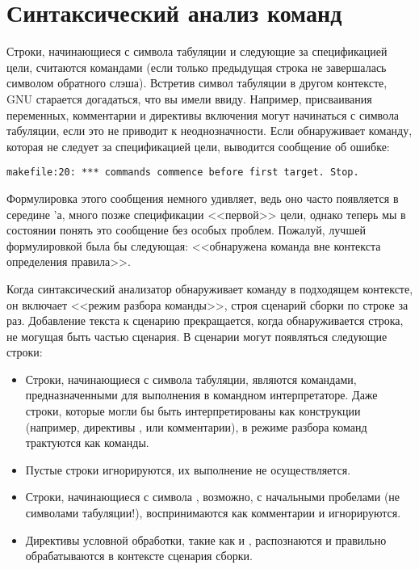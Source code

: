 \section{Синтаксический анализ команд}
\label{sec:parsing_commands}

Строки, начинающиеся с символа табуляции и следующие за спецификацией
цели, считаются командами (если только предыдущая строка не
завершалась символом обратного слэша). Встретив символ табуляции в
другом контексте, GNU \GNUmake{} старается догадаться, что вы имели
ввиду. Например, присваивания переменных, комментарии и директивы
включения могут начинаться с символа табуляции, если это не приводит к
неоднозначности. Если \GNUmake{} обнаруживает команду, которая не
следует за спецификацией цели, выводится сообщение об ошибке:

{\footnotesize
\begin{verbatim}
makefile:20: *** commands commence before first target. Stop.
\end{verbatim}
}

Формулировка этого сообщения немного удивляет, ведь оно часто
появляется в середине \Makefile{}'а, много позже спецификации
<<первой>> цели, однако теперь мы в состоянии понять это сообщение без
особых проблем. Пожалуй, лучшей формулировкой была бы следующая:
<<обнаружена команда вне контекста определения правила>>.

Когда синтаксический анализатор обнаруживает команду в подходящем
контексте, он включает <<режим разбора команды>>, строя сценарий
сборки по строке за раз. Добавление текста к сценарию прекращается,
когда обнаруживается строка, не могущая быть частью сценария.  В
сценарии могут появляться следующие строки:

\begin{itemize}
\item Строки, начинающиеся с символа табуляции, являются командами,
предназначенными для выполнения в командном интерпретаторе. Даже
строки, которые могли бы быть интерпретированы как конструкции
\GNUmake{} (например, директивы , 
или комментарии), в режиме разбора команд трактуются как команды.
\item Пустые строки игнорируются, их выполнение не осуществляется.
\item Строки, начинающиеся с символа \command{\#}, возможно, с
начальными пробелами (не символами табуляции!), воспринимаются как
комментарии \GNUmake{} и игнорируются.
\item Директивы условной обработки, такие как  и
, распознаются и правильно обрабатываются в контексте
сценария сборки.
\end{itemize}


